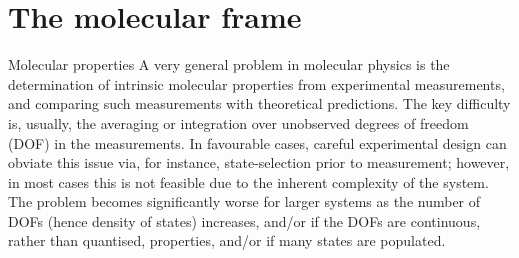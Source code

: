 \section{The molecular frame}

Molecular properties
A very general problem in molecular physics is the determination of intrinsic molecular properties from experimental measurements, and comparing such measurements with theoretical predictions. The key difficulty is, usually, the averaging or integration over unobserved degrees of freedom (DOF) in the measurements. In favourable cases, careful experimental design can obviate this issue via, for instance, state-selection prior to measurement; however, in most cases this is not feasible due to the inherent complexity of the system. The problem becomes significantly worse for larger systems as the number of DOFs (hence density of states) increases, and/or if the DOFs are continuous, rather than quantised, properties, and/or if many states are populated.